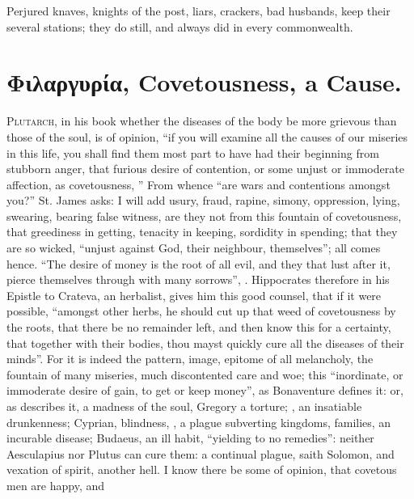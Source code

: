 Perjured knaves, knights of the post, liars, crackers, bad husbands, \etc{} keep their several stations; they do still, and always did in every commonwealth.

\section{\textgreek{Φιλαργυρία}, Covetousness, a Cause.}

\lettrine{P}{lutarch}, in his book whether the diseases of
the body be more grievous than those of the soul, is of opinion, \enquote{if you will
examine all the causes of our miseries in this life, you shall find them most
part to have had their beginning from stubborn anger, that furious desire of
contention, or some unjust or immoderate affection, as covetousness, \etc{}}
From whence \enquote{are wars and contentions amongst you?} St.
James asks: I will add usury, fraud, rapine, simony, oppression, lying,
swearing, bearing false witness, \etc{} are they not from this fountain of
covetousness, that greediness in getting, tenacity in keeping, sordidity in
spending; that they are so wicked, \enquote{unjust against God,
their neighbour, themselves}; all comes hence. \enquote{The desire of money is the root
of all evil, and they that lust after it, pierce themselves through with many
sorrows}, . Hippocrates therefore in his Epistle to
Crateva, an herbalist, gives him this good counsel, that if it were possible,
\enquote{amongst other herbs, he should cut up that weed of
covetousness by the roots, that there be no remainder left, and then know this
for a certainty, that together with their bodies, thou mayst quickly cure all
the diseases of their minds}. For it is indeed the pattern, image, epitome of
all melancholy, the fountain of many miseries, much discontented care and woe;
this \enquote{inordinate, or immoderate desire of gain, to get or keep money}, as
Bonaventure defines it: or, as \Austin{} describes it, a
madness of the soul, Gregory a torture; \Chrysostom{}, an insatiable drunkenness;
Cyprian, blindness, , a plague subverting kingdoms,
families, an incurable disease; Budaeus, an ill habit,
\enquote{yielding to no remedies}: neither Aesculapius nor Plutus
can cure them: a continual plague, saith Solomon, and vexation of spirit,
another hell. I know there be some of opinion, that covetous men are happy, and
